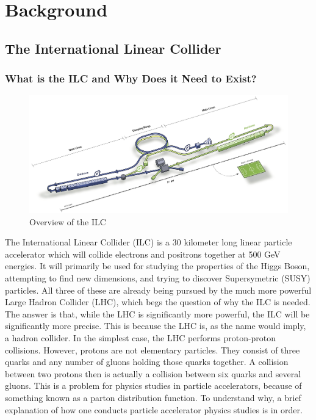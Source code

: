 \documentclass{report}
\begin{document}
    \chapter{ Background }
         \setcounter{page}{1}
        \section{ The International Linear Collider }
            \subsection{ What is the ILC and Why Does it Need to Exist? }
                \begin{figure}[h] 
                    \includegraphics[width=\textwidth]{ilcoverview}
                    \centering
                    \caption{Overview of the ILC}
                    \label{fig:ilcoverview}
                \end{figure}

                The International Linear Collider (ILC) is a 30 kilometer long \cite{parton} linear particle accelerator \cite{specs} which will collide electrons and positrons together at 500 GeV energies. It will primarily be used for studying the properties of the Higgs Boson, attempting to find new dimensions, and trying to discover Supersymetric (SUSY) particles. All three of these are already being pursued by the much more powerful Large Hadron Collider (LHC), which begs the question of why the ILC is needed. The answer is that, while the LHC is significantly more powerful, the ILC will be significantly more precise. This is because the LHC is, as the name would imply, a hadron collider. In the simplest case, the LHC performs proton-proton collisions. However, protons are not elementary particles. They consist of three quarks and any number of gluons holding those quarks together. A collision between two protons then is actually a collision between six quarks and several gluons. This is a problem for physics studies in particle accelerators, because of something known as a parton distribution function. To understand why, a brief explanation of how one conducts particle accelerator physics studies is in order.
\end{document}
